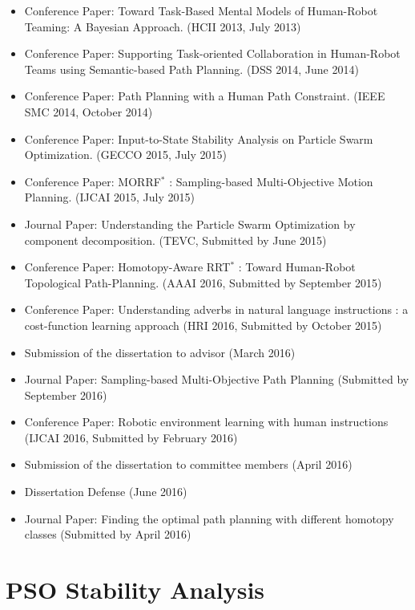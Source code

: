 \documentclass[phd]{byuprop}
\begin{document}
\begin{itemize}
\item Conference Paper: Toward Task-Based Mental Models of Human-Robot Teaming: A Bayesian Approach. (HCII 2013, July 2013)
\item Conference Paper: Supporting Task-oriented Collaboration in Human-Robot Teams using Semantic-based Path Planning. (DSS 2014, June 2014)
\item Conference Paper: Path Planning with a Human
Path Constraint. (IEEE SMC 2014, October 2014)
\item Conference Paper: Input-to-State Stability Analysis on Particle Swarm Optimization. (GECCO 2015, July 2015)
\item Conference Paper: MORRF$^{*}$ : Sampling-based Multi-Objective Motion Planning. (IJCAI 2015, July 2015)
\item Journal Paper: Understanding the Particle Swarm Optimization by component decomposition. (TEVC, Submitted by June 2015)
\item Conference Paper: Homotopy-Aware RRT$^{*}$ : Toward Human-Robot Topological Path-Planning. (AAAI 2016, Submitted by September 2015)
\item Conference Paper: Understanding adverbs in natural language instructions : a
cost-function learning approach (HRI 2016, Submitted by October 2015)
\item Submission of the dissertation to advisor (March 2016)
\item Journal Paper: Sampling-based Multi-Objective Path Planning (Submitted by September 2016)
\item Conference Paper: Robotic environment learning with human instructions (IJCAI 2016, Submitted by February 2016)
\item Submission of the dissertation to committee members (April 2016)
\item Dissertation Defense (June 2016)
\item Journal Paper: Finding the optimal path planning with different homotopy classes (Submitted by April 2016)
\end{itemize}

\appendix

\section{PSO Stability Analysis}
\label{sec:pso_stability_analysis}
\end{document}
